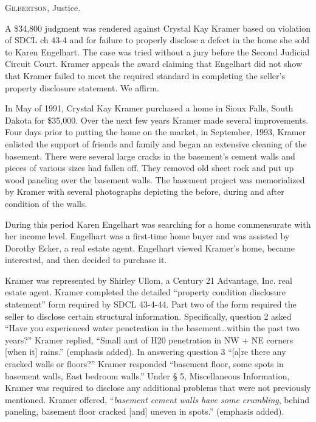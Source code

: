 

\opinion \textsc{Gilbertson}, Justice.

A \$34,800 judgment was rendered against Crystal Kay Kramer based on violation
of SDCL ch 43-4 and for failure to properly disclose a defect in the home she
sold to Karen Engelhart. The case was tried without a jury before the Second
Judicial Circuit Court. Kramer appeals the award claiming that Engelhart did
not show that Kramer failed to meet the required standard in completing the
seller's property disclosure statement. We affirm.


In May of 1991, Crystal Kay Kramer purchased a home in Sioux Falls, South Dakota
for \$35,000. Over the next few years Kramer made several improvements. Four
days prior to putting the home on the market, in September, 1993, Kramer
enlisted the support of friends and family and began an extensive cleaning of
the basement. There were several large cracks in the basement's cement walls
and pieces of various sizes had fallen off. They removed old sheet rock and put
up wood paneling over the basement walls. The basement project was memorialized
by Kramer with several photographs depicting the before, during and after
condition of the walls.

During this period Karen Engelhart was searching for a home commensurate with
her income level. Engelhart was a first-time home buyer and was assisted by
Dorothy Ecker, a real estate agent. Engelhart viewed Kramer's home, became
interested, and then decided to purchase it.

Kramer was represented by Shirley Ullom, a Century 21 Advantage, Inc. real
estate agent. Kramer completed the detailed ``property condition disclosure
statement'' form required by SDCL 43-4-44. Part two of the form required the
seller to disclose certain structural information. Specifically, question 2
asked ``Have you experienced water penetration in the basement\ldots within the
past two years?'' Kramer replied, ``Small amt of H20 penetration in NW + NE
corners [when it] rains.'' (emphasis added). In answering question 3 ``[a]re
there any cracked walls or floors?'' Kramer responded ``basement floor, some
spots in basement walls, East bedroom walls.'' Under {\S} 5, Miscellaneous
Information, Kramer was required to disclose any additional problems that were
not previously mentioned. Kramer offered, ``\textit{basement cement walls have
some crumbling}, behind paneling, basement floor cracked [and] uneven in
spots.'' (emphasis added).

